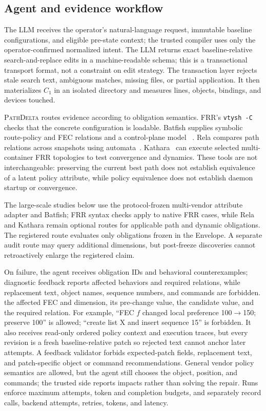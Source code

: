 \documentclass[conference]{IEEEtran}
\newcommand{\system}{\textsc{PathDelta}\xspace}
\begin{document}
\subsection{Agent and evidence workflow}

The LLM receives the operator's natural-language request, immutable baseline
configurations, and eligible pre-state context; the trusted compiler uses only
the operator-confirmed normalized intent.  The LLM returns exact
baseline-relative search-and-replace edits in a machine-readable schema; this
is a transactional transport format, not a constraint on edit strategy.  The
transaction layer rejects stale search text,
ambiguous matches, missing files, or partial application.  It then materializes
$C_1$ in an isolated directory and measures lines, objects, bindings, and
devices touched.

\system routes evidence according to obligation semantics.  FRR's
\texttt{vtysh -C}~\cite{frrouting} checks that the concrete configuration is
loadable.  Batfish supplies symbolic
route-policy and FEC relations and a control-plane model
~\cite{fogel2015batfish,brown2023batfish}.  Rela compares path relations across
snapshots using automata~\cite{xu2024rela}.  Kathara~\cite{kathara} can execute
selected multi-container FRR topologies to test convergence and dynamics.
These tools are not interchangeable: preserving the current best path does not
establish equivalence of a latent policy attribute, while policy equivalence
does not establish daemon startup or convergence.

The large-scale studies below use the protocol-frozen multi-vendor attribute
adapter and Batfish; FRR syntax checks apply to native FRR cases, while Rela and
Kathara remain optional routes for applicable path and dynamic obligations.
The registered route evaluates only obligations frozen in the Envelope.  A
separate audit route may query additional dimensions, but post-freeze
discoveries cannot retroactively enlarge the registered claim.

On failure, the agent receives obligation IDs and behavioral counterexamples;
diagnostic feedback reports affected behaviors and required relations, while
replacement text, object names, sequence numbers, and commands are forbidden.
the affected FEC and dimension, its pre-change value, the candidate value, and
the required relation.  For example, ``FEC $f$ changed local preference
100$\rightarrow$150; preserve 100'' is allowed; ``create list X and insert
sequence 15'' is forbidden.  It also receives
read-only ordered policy context and execution traces, but every revision is a
fresh baseline-relative patch so rejected text cannot anchor later attempts.
A feedback validator forbids expected-patch fields, replacement text, and
patch-specific object or command recommendations.  General vendor policy
semantics are allowed, but the agent still chooses the object, position, and
commands; the trusted side reports impacts rather than solving the repair.
Runs enforce maximum attempts, token and completion budgets, and separately
record calls, backend attempts, retries, tokens, and latency.
\end{document}

